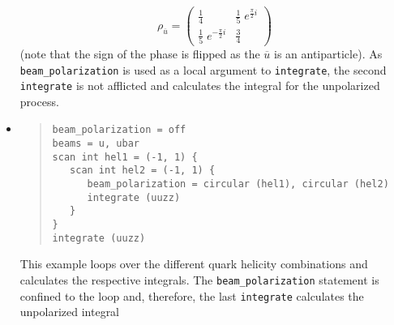 \documentclass[12pt]{book}
\newcommand{\ttt}[1]{\texttt{#1}}
\begin{document}
\begin{itemize}
{\[ \rho_{\overline{u}} = \begin{pmatrix}
\frac{1}{4} & \frac{1}{5}\;e^{\frac{\pi}{2}i} \\
\frac{1}{5}\;e^{-\frac{\pi}{2}i} & \frac{3}{4}
\end{pmatrix} \]
}
(note that the sign of the phase is flipped as the $\overline{u}$ is an
antiparticle). As \ttt{beam\_polarization} is used as a
local argument to \ttt{integrate}, the second \ttt{integrate} is not afflicted
and calculates the integral for the unpolarized process.
%
\item
\begin{quote}
\begin{footnotesize}
\begin{verbatim}
beam_polarization = off
beams = u, ubar
scan int hel1 = (-1, 1) {
   scan int hel2 = (-1, 1) {
      beam_polarization = circular (hel1), circular (hel2)
      integrate (uuzz)
   }
}
integrate (uuzz)
\end{verbatim}
\end{footnotesize}
\end{quote}
This example loops over the different quark helicity combinations and calculates
the respective integrals. The \ttt{beam\_polarization} statement is confined
to the loop and, therefore, the last \ttt{integrate} calculates the unpolarized
integral
\end{itemize}
%
\end{document}
